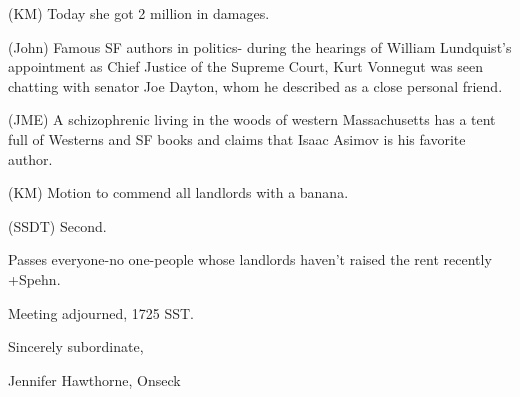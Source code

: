 \documentclass[12pt]{article}
\begin{document}
(KM) Today she got 2 million in damages.

(John) Famous SF authors in politics- during the hearings of William Lundquist's appointment as Chief Justice of the Supreme Court, Kurt Vonnegut was seen chatting with senator Joe Dayton, whom he described as a close personal friend.

(JME) A schizophrenic living in the woods of western Massachusetts has a tent full of Westerns and SF books and claims that Isaac Asimov is his favorite author.

(KM) Motion to commend all landlords with a banana.

(SSDT) Second.

Passes everyone-no one-people whose landlords haven't raised the rent recently +Spehn.

\vspace{12pt}

\noindent
Meeting adjourned, 1725 SST.

\vspace{18pt}

\centerline{Sincerely subordinate,}
\centerline{Jennifer Hawthorne, Onseck}
\end{document}
